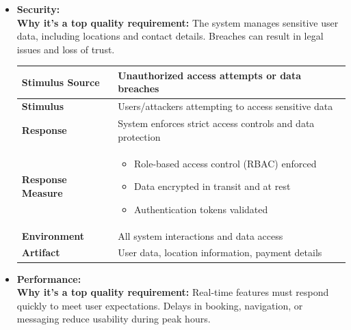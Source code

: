 \documentclass[12pt]{article}
\begin{document}
\begin{itemize}
  \item \textbf{Security:} \\
  \textbf{Why it's a top quality requirement:} The system manages sensitive user data, including locations and contact details. Breaches can result in legal issues and loss of trust. \\

  \begin{table}[h]
\centering
\begin{tabular}{|l|p{10cm}|}
\hline
\textbf{Stimulus Source} & Unauthorized access attempts or data breaches \\
\hline
\textbf{Stimulus} & Users/attackers attempting to access sensitive data \\
\hline
\textbf{Response} & System enforces strict access controls and data protection \\
\hline
\textbf{Response Measure} & 
\begin{itemize}
  \item Role-based access control (RBAC) enforced
  \item Data encrypted in transit and at rest
  \item Authentication tokens validated
\end{itemize} \\
\hline
\textbf{Environment} & All system interactions and data access \\
\hline
\textbf{Artifact} & User data, location information, payment details \\
\hline
\end{tabular}
\end{table}

  \item \textbf{Performance:} \\
  \textbf{Why it's a top quality requirement:} Real-time features must respond quickly to meet user expectations. Delays in booking, navigation, or messaging reduce usability during peak hours. \\


\end{itemize}
\end{document}
